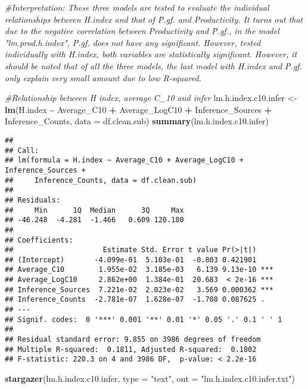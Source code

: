 \documentclass[
]{article}
\newenvironment{Shaded}{\begin{snugshade}}{\end{snugshade}}
\newcommand{\AttributeTok}[1]{\textcolor[rgb]{0.13,0.29,0.53}{#1}}
\newcommand{\CommentTok}[1]{\textcolor[rgb]{0.56,0.35,0.01}{\textit{#1}}}
\newcommand{\FunctionTok}[1]{\textcolor[rgb]{0.13,0.29,0.53}{\textbf{#1}}}
\newcommand{\NormalTok}[1]{#1}
\newcommand{\OtherTok}[1]{\textcolor[rgb]{0.56,0.35,0.01}{#1}}
\newcommand{\SpecialCharTok}[1]{\textcolor[rgb]{0.81,0.36,0.00}{\textbf{#1}}}
\newcommand{\StringTok}[1]{\textcolor[rgb]{0.31,0.60,0.02}{#1}}
\begin{document}
\begin{Shaded}
\begin{Highlighting}[]
\CommentTok{\#Interpretation: These three models are tested to evaluate the individual relationships between H.index and that of P.gf. and Productivity. It turns out that due to the negative correlation between Productivity and P.gf., in the model "lm.prod.h.index", P.gf. does not have any significant. However, tested individually with H.index, both variables are statistically significant. However, it should be noted that of all the three models, the last model with H.index and P.gf. only explain very small amount due to low R{-}squared.}

\CommentTok{\#Relationship between H index, average C\_10 and infer}
\NormalTok{lm.h.index.c10.infer }\OtherTok{\textless{}{-}} \FunctionTok{lm}\NormalTok{(H.index }\SpecialCharTok{\textasciitilde{}}\NormalTok{ Average\_C10 }\SpecialCharTok{+}\NormalTok{ Average\_LogC10 }\SpecialCharTok{+}\NormalTok{ Inference\_Sources }\SpecialCharTok{+}\NormalTok{ Inference\_Counts, }\AttributeTok{data =}\NormalTok{ df.clean.sub)}
\FunctionTok{summary}\NormalTok{(lm.h.index.c10.infer)}
\end{Highlighting}
\end{Shaded}

\begin{verbatim}
## 
## Call:
## lm(formula = H.index ~ Average_C10 + Average_LogC10 + Inference_Sources + 
##     Inference_Counts, data = df.clean.sub)
## 
## Residuals:
##     Min      1Q  Median      3Q     Max 
## -46.248  -4.281  -1.466   0.609 120.180 
## 
## Coefficients:
##                     Estimate Std. Error t value Pr(>|t|)    
## (Intercept)       -4.099e-01  5.103e-01  -0.803 0.421901    
## Average_C10        1.955e-02  3.185e-03   6.139 9.13e-10 ***
## Average_LogC10     2.862e+00  1.384e-01  20.683  < 2e-16 ***
## Inference_Sources  7.221e-02  2.023e-02   3.569 0.000362 ***
## Inference_Counts  -2.781e-07  1.628e-07  -1.708 0.087625 .  
## ---
## Signif. codes:  0 '***' 0.001 '**' 0.01 '*' 0.05 '.' 0.1 ' ' 1
## 
## Residual standard error: 9.855 on 3986 degrees of freedom
## Multiple R-squared:  0.1811, Adjusted R-squared:  0.1802 
## F-statistic: 220.3 on 4 and 3986 DF,  p-value: < 2.2e-16
\end{verbatim}

\begin{Shaded}
\begin{Highlighting}[]
\FunctionTok{stargazer}\NormalTok{(lm.h.index.c10.infer, }\AttributeTok{type =} \StringTok{"text"}\NormalTok{, }\AttributeTok{out =} \StringTok{"lm.h.index.c10.infer.txt"}\NormalTok{)}
\end{Highlighting}
\end{Shaded}
\end{document}
